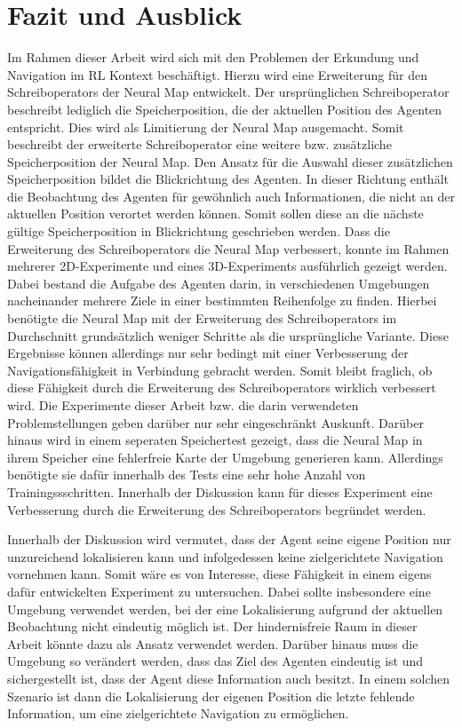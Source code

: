 \chapter{Fazit und Ausblick}

Im Rahmen dieser Arbeit wird sich mit den Problemen der Erkundung und Navigation im RL Kontext beschäftigt. Hierzu wird eine Erweiterung für den Schreiboperators der Neural Map entwickelt. Der ursprünglichen Schreiboperator beschreibt lediglich die Speicherposition, die der aktuellen Position des Agenten entspricht. Dies wird als Limitierung der Neural Map ausgemacht. Somit beschreibt der erweiterte Schreiboperator eine weitere bzw. zusätzliche Speicherposition der Neural Map. Den Ansatz für die Auswahl dieser zusätzlichen Speicherposition bildet die Blickrichtung des Agenten. In dieser Richtung enthält die Beobachtung des Agenten für gewöhnlich auch Informationen, die nicht an der aktuellen Position verortet werden können. Somit sollen diese an die nächste gültige Speicherposition in Blickrichtung geschrieben werden. Dass die Erweiterung des Schreiboperators die Neural Map verbessert, konnte im Rahmen mehrerer 2D-Experimente und eines 3D-Experiments ausführlich gezeigt werden. Dabei bestand die Aufgabe des Agenten darin, in verschiedenen Umgebungen nacheinander mehrere Ziele in einer bestimmten Reihenfolge zu finden. Hierbei benötigte die Neural Map mit der Erweiterung des Schreiboperators im Durchschnitt grundsätzlich weniger Schritte als die ursprüngliche Variante. Diese Ergebnisse können allerdings nur sehr bedingt mit einer Verbesserung der Navigationsfähigkeit in Verbindung gebracht werden. Somit bleibt fraglich, ob diese Fähigkeit durch die Erweiterung des Schreiboperators wirklich verbessert wird. Die Experimente dieser Arbeit bzw. die darin verwendeten Problemstellungen geben darüber nur sehr eingeschränkt Auskunft. Darüber hinaus wird in einem seperaten Speichertest gezeigt, dass die Neural Map in ihrem Speicher eine fehlerfreie Karte der Umgebung generieren kann. Allerdings benötigte sie dafür innerhalb des Tests eine sehr hohe Anzahl von Trainingssschritten. Innerhalb der Diskussion kann für dieses Experiment eine Verbesserung durch die Erweiterung des Schreiboperators begründet werden.

Innerhalb der Diskussion wird vermutet, dass der Agent seine eigene Position nur unzureichend lokalisieren kann und infolgedessen keine zielgerichtete Navigation vornehmen kann. Somit wäre es von Interesse, diese Fähigkeit in einem eigens dafür entwickelten Experiment zu untersuchen. Dabei sollte insbesondere eine Umgebung verwendet werden, bei der eine Lokalisierung aufgrund der aktuellen Beobachtung nicht eindeutig möglich ist. Der hindernisfreie Raum in dieser Arbeit könnte dazu als Ansatz verwendet werden. Darüber hinaus muss die Umgebung so verändert werden, dass das Ziel des Agenten eindeutig ist und sichergestellt ist, dass der Agent diese Information auch besitzt. In einem solchen Szenario ist dann die Lokalisierung der eigenen Position die letzte fehlende Information, um eine zielgerichtete Navigation zu ermöglichen.

